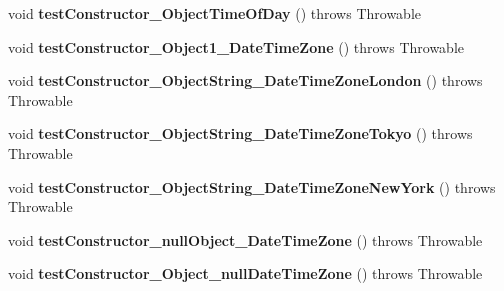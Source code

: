 \begin{DoxyCompactItemize}
\item 
\hypertarget{classorg_1_1joda_1_1time_1_1_test_local_time___constructors_af4bbda86ddb08fe8f99a0cc9c95bf798}{void {\bfseries test\-Constructor\-\_\-\-Object\-Time\-Of\-Day} ()  throws Throwable }\label{classorg_1_1joda_1_1time_1_1_test_local_time___constructors_af4bbda86ddb08fe8f99a0cc9c95bf798}

\item 
\hypertarget{classorg_1_1joda_1_1time_1_1_test_local_time___constructors_a3e2b0ef826e91d3aa6c3f4526dcc5cdb}{void {\bfseries test\-Constructor\-\_\-\-Object1\-\_\-\-Date\-Time\-Zone} ()  throws Throwable }\label{classorg_1_1joda_1_1time_1_1_test_local_time___constructors_a3e2b0ef826e91d3aa6c3f4526dcc5cdb}

\item 
\hypertarget{classorg_1_1joda_1_1time_1_1_test_local_time___constructors_abd38c05701152b9167b48a2f1a276ec9}{void {\bfseries test\-Constructor\-\_\-\-Object\-String\-\_\-\-Date\-Time\-Zone\-London} ()  throws Throwable }\label{classorg_1_1joda_1_1time_1_1_test_local_time___constructors_abd38c05701152b9167b48a2f1a276ec9}

\item 
\hypertarget{classorg_1_1joda_1_1time_1_1_test_local_time___constructors_abb81609f904e72de7cef3f969164eb0a}{void {\bfseries test\-Constructor\-\_\-\-Object\-String\-\_\-\-Date\-Time\-Zone\-Tokyo} ()  throws Throwable }\label{classorg_1_1joda_1_1time_1_1_test_local_time___constructors_abb81609f904e72de7cef3f969164eb0a}

\item 
\hypertarget{classorg_1_1joda_1_1time_1_1_test_local_time___constructors_a270e4d860e3a6e504df679510b34ba78}{void {\bfseries test\-Constructor\-\_\-\-Object\-String\-\_\-\-Date\-Time\-Zone\-New\-York} ()  throws Throwable }\label{classorg_1_1joda_1_1time_1_1_test_local_time___constructors_a270e4d860e3a6e504df679510b34ba78}

\item 
\hypertarget{classorg_1_1joda_1_1time_1_1_test_local_time___constructors_a6211ddcf216c96cad2d37abb1ceab2ba}{void {\bfseries test\-Constructor\-\_\-null\-Object\-\_\-\-Date\-Time\-Zone} ()  throws Throwable }\label{classorg_1_1joda_1_1time_1_1_test_local_time___constructors_a6211ddcf216c96cad2d37abb1ceab2ba}

\item 
\hypertarget{classorg_1_1joda_1_1time_1_1_test_local_time___constructors_aec190641a1df1089ced80f29bbadd811}{void {\bfseries test\-Constructor\-\_\-\-Object\-\_\-null\-Date\-Time\-Zone} ()  throws Throwable }\label{classorg_1_1joda_1_1time_1_1_test_local_time___constructors_aec190641a1df1089ced80f29bbadd811}


\end{DoxyCompactItemize}
